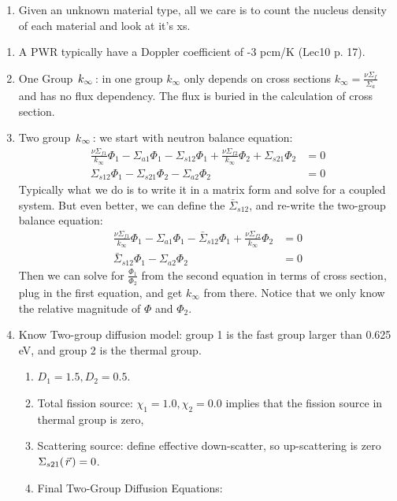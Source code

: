 \documentclass{school-22.211-notes}
\begin{document}
\begin{enumerate}
\item Given an unknown material type, all we care is to count the nucleus density of each material and look at it's xs. 
\end{enumerate}


\clearpage
{}
\begin{enumerate}
\item A PWR typically have a Doppler coefficient of -3 pcm/K (Lec10 p. 17). 

\item One Group $\left. k_{\infty} \right.$: in one group $k_{\infty}$ only depends on cross sections $k_{\infty} = \frac{\nu \Sigma_f}{\Sigma_a}$ and has no flux dependency. The flux is buried in the calculation of cross section.

\item Two group $\left. k_{\infty} \right.$: we start with neutron balance equation:
  \begin{align}
    \frac{\nu \Sigma_{f1}}{k_{\infty}} \Phi_1 - \Sigma_{a1} \Phi_1 - \Sigma_{s12} \Phi_1 + \frac{\nu \Sigma_{f2}}{k_{\infty}} \Phi_2 + \Sigma_{s21} \Phi_2 &= 0 \\
\Sigma_{s12} \Phi_1 - \Sigma_{s21} \Phi_2 - \Sigma_{a2} \Phi_2 &= 0 
  \end{align}
  Typically what we do is to write it in a matrix form and solve for a coupled system. But even better, we can define the  $\bar{\Sigma}_{s12}$, and re-write the two-group balance equation: 
  \begin{align}
    \frac{\nu \Sigma_{f1}}{k_{\infty}} \Phi_1 - \Sigma_{a1} \Phi_1 - \bar{\Sigma}_{s12} \Phi_1 + \frac{\nu \Sigma_{f2}}{k_{\infty}} \Phi_2 &= 0 \\
    \bar{\Sigma}_{s12} \Phi_1- \Sigma_{a2} \Phi_2 &= 0 
  \end{align}
  Then we can solve for $\frac{\Phi_1}{\Phi_2}$ from the second equation in terms of cross section, plug in the first equation, and get $k_{\infty}$ from there. Notice that we only know the relative magnitude of $\Phi$ and $\Phi_2$. 

\item Know Two-group diffusion model: group 1 is the fast group larger than 0.625 eV, and group 2 is the thermal group. 
\begin{enumerate}
\item $D_1 = 1.5, D_2 = 0.5$.
\item Total fission source: $\chi_1 = 1.0, \chi_2 = 0.0$ implies that the fission source in thermal group is zero,
\item Scattering source: define effective down-scatter, so up-scattering is zero $\Sigma_{s21} (\left.\vec{r}\right.) = 0$. 
\item Final Two-Group Diffusion Equations: 
\end{enumerate}


\end{enumerate}
\end{document}
